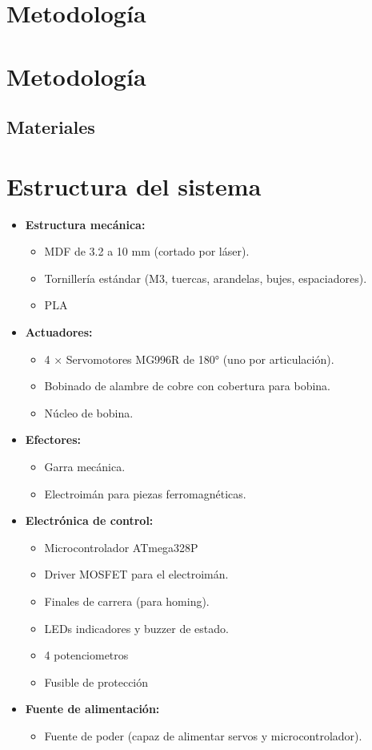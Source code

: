 \section{Metodología}
\section{Metodología}
\subsection{Materiales}
\section*{Estructura del sistema}

\begin{itemize}[leftmargin=1.2cm]
  \item \textbf{Estructura mecánica:}
  \begin{itemize}
    \item MDF de 3.2 a 10 mm (cortado por láser).
    \item Tornillería estándar (M3, tuercas, arandelas, bujes, espaciadores).
    \item PLA
  \end{itemize}

  \item \textbf{Actuadores:}
  \begin{itemize}
    \item 4 × Servomotores MG996R de 180° (uno por articulación).
    \item Bobinado de alambre de cobre con cobertura para bobina.
    \item Núcleo de bobina.
  \end{itemize}

  \item \textbf{Efectores:}
  \begin{itemize}
    \item Garra mecánica.
    \item Electroimán para piezas ferromagnéticas.
  \end{itemize}

  \item \textbf{Electrónica de control:}
  \begin{itemize}
    \item Microcontrolador ATmega328P 
    \item Driver MOSFET  para el electroimán.
    \item Finales de carrera (para homing).
    \item LEDs indicadores y buzzer de estado.
    \item 4 potenciometros
    \item Fusible de protección 
    
  \end{itemize}

  \item \textbf{Fuente de alimentación:}
  \begin{itemize}
    \item Fuente de poder (capaz de alimentar servos y microcontrolador).
  \end{itemize}
\end{itemize}
